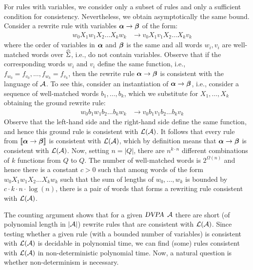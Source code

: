 For rules with variables, we consider only a subset of rules and only a sufficient condition for consistency. 
Nevertheless, we obtain asymptotically the same bound. 
Consider a rewrite rule with variables $\boldsymbol{\alpha} \to \boldsymbol{\beta}$ of the form:
\begin{align*}
 && w_0 X_1 w_1 X_2 \ldots  X_k w_{k} &\to v_0 X_1 v_1 X_2 \ldots  X_k v_{k}
\end{align*}
where the order of variables in $\boldsymbol{\alpha}$ and $\boldsymbol{\beta}$ is the same and all words $w_i,v_i$ are well-matched words over $\widehat{\Sigma}$, i.e.,
do not contain variables.
Observe that if the corresponding words $w_i$ and $v_i$ define the same function, i.e., 
$f_{w_0} = f_{v_0}, \ldots, f_{w_{k}} = f_{v_k}$, then the rewrite rule $\boldsymbol{\alpha} \to \boldsymbol{\beta}$ is consistent with the language of $\mathcal{A}$. 
To see this, consider an instantiation of $\boldsymbol{\alpha} \to \boldsymbol{\beta}$, i.e., 
consider a sequence of well-matched words $b_1, \ldots, b_k$, which we substitute for $X_1, \ldots, X_k$
obtaining the ground rewrite rule:
\begin{align*}
&&	w_0 b_1 w_1 b_2 \ldots  b_k w_{k} &\to v_0 b_1 v_1 b_2 \ldots  b_k v_{k}
\end{align*}
Observe that the left-hand side and the right-hand side define the same function, and hence this ground rule is 
consistent with $\mathcal{L}(\mathcal{A})$.
It follows that every rule from $\llbracket \boldsymbol{\alpha} \to \boldsymbol{\beta} \rrbracket$ is consistent with $\mathcal{L}(\mathcal{A})$, which by definition means that 
$\boldsymbol{\alpha} \to \boldsymbol{\beta}$ is consistent with $\mathcal{L}(\mathcal{A})$.
Now, setting $n = |Q|$, there are $n^{k\cdot n}$ different combinations of $k$ functions from $Q$ to $Q$. 
The number of well-matched words is $2^{\Omega(n)}$ and hence there is a constant $c>0$ such that
among words of the form $w_0 X_1 w_1 X_2 \ldots  X_k w_{k}$ such that 
the sum of lengths of $w_0, \ldots, w_k$ is bounded by  ${c \cdot k\cdot n \cdot \log(n)}$, 
there is a pair of words that forms a rewriting rule consistent with $\mathcal{L}(\mathcal{A})$.

The counting argument shows that for a given $\textsl{DVPA}$ $\mathcal{A}$ there are short (of polynomial length in $|\mathcal{A}|$) 
rewrite rules that are consistent with $\mathcal{L}(\mathcal{A})$. 
Since testing whether a given rule (with a bounded number of variables)
is consistent with $\mathcal{L}(\mathcal{A})$ is decidable in polynomial time, we can find (some) rules consistent with $\mathcal{L}(\mathcal{A})$ in non-deterministic polynomial time. 
Now, a natural question is whether non-determinism is necessary.  

